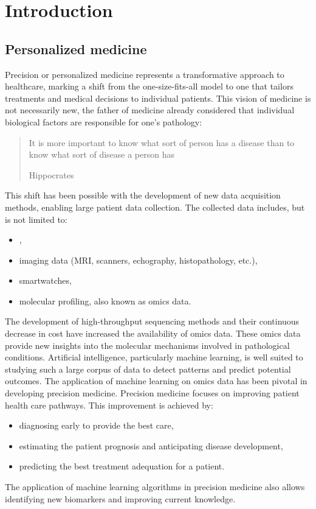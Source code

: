 \documentclass[../main.tex]{subfiles}
\begin{document}

\chapter{Introduction}
\minitoc

\section{Personalized medicine}
 Precision or personalized medicine represents a transformative approach to healthcare, marking a shift from the one-size-fits-all model to one that tailors treatments and medical decisions to individual patients.
 This vision of medicine is not necessarily new, the father of medicine already considered that individual biological factors are responsible for one's pathology: \blockquote[Hippocrates][.]{It is more important to know what sort of person has a disease than to know what sort of disease a person has}.
 This shift has been possible with the development of new data acquisition methods, enabling large patient data collection.
 The collected data includes, but is not limited to:
 \begin{itemize}[nosep]
	 \item {},
	 \item imaging data (MRI, scanners, echography, histopathology, etc.),
	 \item smartwatches,
	 \item molecular profiling, also known as omics data.
 \end{itemize}
 The development of high-throughput sequencing methods and their continuous decrease in cost have increased the availability of omics data.
 These omics data provide new insights into the molecular mechanisms involved in pathological conditions.
 Artificial intelligence, particularly machine learning, is well suited to studying such a large corpus of data to detect patterns and predict potential outcomes.
 The application of machine learning on omics data has been pivotal in developing precision medicine.
 Precision medicine focuses on improving patient health care pathways.
 This improvement is achieved by:
 \begin{itemize}[nosep]
	 \item diagnosing early to provide the best care,
	 \item estimating the patient prognosis and anticipating disease development,
	 \item predicting the best treatment adequation for a patient.
 \end{itemize}
 The application of machine learning algorithms in precision medicine also allows identifying new biomarkers and improving current knowledge.
\end{document}
